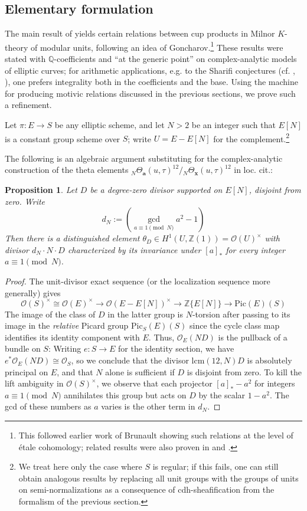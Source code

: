\documentclass[a4paper,reqno,11pt]{amsart}
\theoremstyle{plain}
\newtheorem{proposition}[theorem]{Proposition}
\theoremstyle{definition}
\theoremstyle{remark}
\newcommand{\Z}{\mathbb{Z}}
\newcommand{\Q}{\mathbb{Q}}
\newcommand{\Pic}{\mathrm{Pic}}
\begin{document}
\subsection{Elementary formulation}

The main result of \cite{BPPS} yields certain relations between cup products in Milnor $K$-theory of modular units, following an idea of Goncharov.\footnote{This followed earlier work of Brunault \cite{Bru} showing such relations at the level of \'{e}tale cohomology; related results were also proven in \cite{FK} and \cite{SV}.} These results were stated with $\Q$-coefficients and ``at the generic point'' on complex-analytic models of elliptic curves; for arithmetic applications, e.g. to the Sharifi conjectures (cf. \cite{SV}, \cite{LSSW}), one prefers integrality both in the coefficients and the base. Using the machine for producing motivic relations discussed in the previous sections, we prove such a refinement. 

Let $\pi:E\to S$ be any elliptic scheme, and let $N>2$ be an integer such that $E[N]$ is a constant group scheme over $S$; write $U=E-E[N]$ for the complement.\footnote{We treat here only the case where $S$ is regular; if this fails, one can still obtain analogous results by replacing all unit groups with the groups of units on semi-normalizations as a consequence of cdh-sheafification from the formalism of the previous section.}

The following is an algebraic argument substituting for the complex-analytic construction of the theta elements ${}_N\Theta_{\mathbf{a}}(u,\tau)^{12}/{}_N\Theta_{\mathbf{x}}(u,\tau)^{12}$ in loc. cit.: 

\begin{proposition}\label{prop:integral-theta}
Let $D$ be a degree-zero divisor supported on $E[N]$, disjoint from zero. Write 
\[
d_N:=\left(\gcd_{a\equiv 1\pmod{N}} a^2-1\right)
\]
Then there is a
distinguished element $\theta_{D}\in H^1(U,\Z(1)) =\mathcal{O}(U)^\times$ with divisor $d_N\cdot N\cdot D$ characterized by its invariance under $[a]_*$ for every integer $a\equiv 1\pmod{N}$. 
\end{proposition}
\begin{proof}
The unit-divisor exact sequence (or the localization sequence more generally) gives
\[
\mathcal{O}(S)^\times \cong \mathcal{O}(E)^\times \to  \mathcal{O}(E-E[N])^{\times} \to \Z\{E[N]\} \to \Pic(E)(S)
\]
The image of the class of $D$ in the latter group is $N$-torsion after passing to its image in the \emph{relative} Picard group $\Pic_S(E)(S)$ since the cycle class map identifies its identity component with $E$. Thus, $\mathcal{O}_E(ND)$ is the pullback of a bundle on $S$: Writing $e:S\to E$ for the identity section, we have
$e^*\mathcal O_E(ND)\cong\mathcal O_S$, so we conclude that the divisor $\mathrm{lcm}(12,N)D$ is absolutely principal on $E$, and that $N$ alone is sufficient if $D$ is disjoint from zero. To kill the lift ambiguity in $\mathcal{O}(S)^\times$, we observe that each projector $[a]_*-a^2$ for integers $a\equiv 1\pmod{N}$ annihilates this group but acts on $D$ by the scalar $1-a^2$. The gcd of these numbers as $a$ varies is the other term in $d_N$.
\end{proof}
\end{document}

